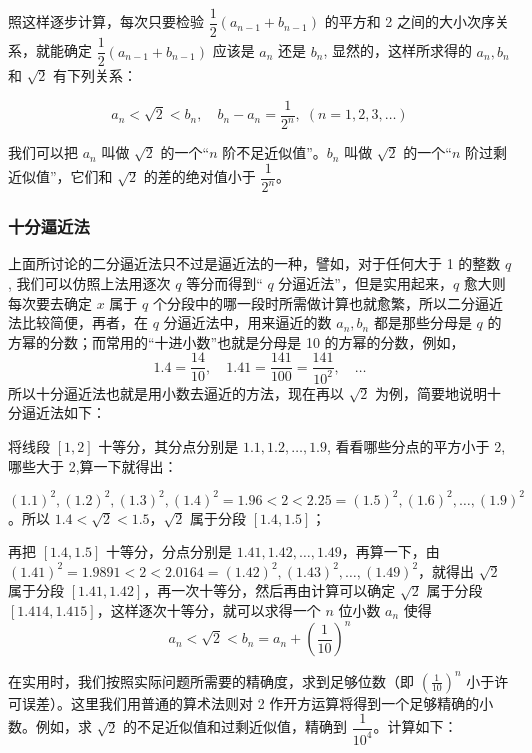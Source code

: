 \medskip
{\linespread{1.6}\selectfont 照这样逐步计算，每次只要检验 $\dfrac{1}{2}(a_{n-1}+b_{n-1})$ 的平方和 2 之间的大小次序关系，就能确定 $\dfrac{1}{2}(a_{n-1}+b_{n-1})$ 应该是 $a_n$ 还是 $b_n$, 显然的，这样所求得的 $a_n,b_n$ 和 $\sqrt{2}$ 有下列关系：\par}
\[a_n<\sqrt{2}<b_n,\quad b_n-a_n=\frac{1}{2^n},\; (n=1,2,3,\ldots)\]

我们可以把 $a_n$ 叫做 $\sqrt{2}$ 的一个“$n$ 阶不足近似值”。$b_n$ 叫做 $\sqrt{2}$ 的一个“$n$ 阶过剩近似值”，它们和 $\sqrt{2}$ 的差的绝对值小于 $\dfrac{1}{2^n}$。


\subsubsection{十分逼近法}

上面所讨论的二分逼近法只不过是逼近法的一种，譬如，对于任何大于 1 的整数 $q$, 我们可以仿照上法用逐次 $q$ 等分而得到“ $q$ 分逼近法”，但是实用起来，$q$ 愈大则每次要去确定 $x$ 属于 $q$ 个分段中的哪一段时所需做计算也就愈繁，所以二分逼近法比较简便，再者，在 $q$ 分逼近法中，用来逼近的数 $a_n,b_n$ 都是那些分母是 $q$ 的方幂的分数；而常用的“十进小数”也就是分母是 10 的方幂的分数，例如，
\[1.4=\frac{14}{10},\quad  1.41=\frac{141}{100}=\frac{141}{10^2},\quad \ldots \]
所以十分逼近法也就是用小数去逼近的方法，现在再以 $\sqrt{2}$ 为例，简要地说明十分逼近法如下：

将线段 $[1,2]$ 十等分，其分点分别是 $1.1,1.2,\ldots,1.9$, 看看哪些分点的平方小于 2, 哪些大于 2,算一下就得出：

$(1.1)^2,(1.2)^2,(1.3)^2,(1.4)^2=1.96<2<2.25=(1.5)^2,(1.6)^2,\ldots ,(1.9)^2$。所以 $1.4<\sqrt{2}<1.5$，$\sqrt{2}$ 属于分段 $[1.4,1.5]$；

再把 $[1.4,1.5]$ 十等分，分点分别是 $1.41,1.42,\ldots,1.49$，再算一下，由$(1.41)^2=1.9891<2<2.0164=(1.42)^2,(1.43)^2,\ldots,(1.49)^2$，就得出 $\sqrt{2}$ 属于分段 $[1.41,1.42]$，再一次十等分，然后再由计算可以确定 $\sqrt{2}$ 属于分段  $[1.414,1.415]$，这样逐次十等分，就可以求得一个 $n$ 位小数 $a_n$ 使得
\[a_n<\sqrt{2}<b_n=a_n+\left(\frac{1}{10}\right)^n\]

在实用时，我们按照实际问题所需要的精确度，求到足够位数（即 $\left(\frac{1}{10}\right)^n$ 小于许可误差）。这里我们用普通的算术法则对 2 作开方运算将得到一个足够精确的小数。例如，求 $\sqrt{2}$ 的不足近似值和过剩近似值，精确到 $\dfrac{1}{10^4}$。计算如下：

